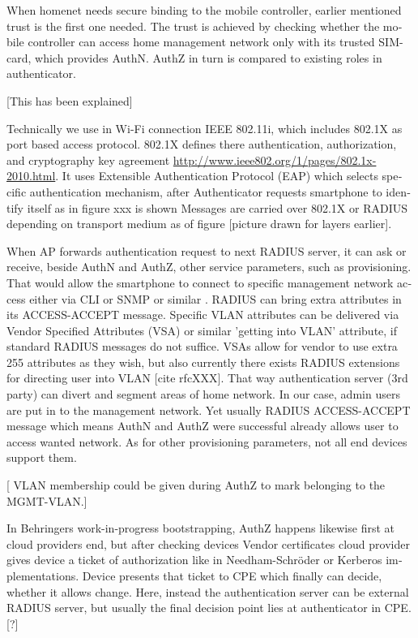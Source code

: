 \documentclass[12pt,a4paper,english]{tutthesis}
\begin{document}
\begin{otherlanguage}{english}
When homenet needs secure binding to the mobile controller, earlier
mentioned trust is the first one needed.  The trust is achieved by
checking whether the mobile controller can access home management
network only with its trusted SIM-card, which provides AuthN. AuthZ in
turn is compared to existing roles in authenticator.


[This has been explained]

Technically we use in Wi-Fi connection IEEE 802.11i, which includes
802.1X as port based access protocol.  802.1X defines there
authentication, authorization, and cryptography key agreement
\url{http://www.ieee802.org/1/pages/802.1x-2010.html}. It uses
Extensible Authentication Protocol (EAP) which selects specific
authentication mechanism\cite[p.3]{rfc5247}, after Authenticator
requests smartphone to identify itself as in figure xxx is shown
Messages are carried over 802.1X or RADIUS depending on transport
medium as of figure [picture drawn for layers earlier].


When AP forwards authentication request to next RADIUS server, it can
ask or receive, beside AuthN and AuthZ, other service parameters, such
as provisioning. That would allow the smartphone to connect to
specific management network access either via CLI or SNMP or similar
\cite[p.4]{rfc5608}.  RADIUS can bring extra attributes in its
ACCESS-ACCEPT message.  Specific VLAN attributes can be delivered via
Vendor Specified Attributes (VSA) or similar 'getting into VLAN'
attribute, if standard RADIUS messages do not suffice.  VSAs allow for
vendor to use extra 255 attributes as they wish, but also currently
there exists RADIUS extensions for directing user into VLAN [cite
rfcXXX].  That way authentication server (3rd party) can divert and
segment areas of home network.  In our case, admin users are put in to
the management network.
  Yet usually RADIUS ACCESS-ACCEPT message which means AuthN and
AuthZ were successful already allows user to access wanted network. As
for other provisioning parameters, not all end devices support them.

[ VLAN membership could be given during AuthZ to mark belonging to the
MGMT-VLAN.]  





In Behringers work-in-progress  bootstrapping\cite{draft-behringer-bootstrap},
AuthZ happens likewise first at cloud providers
end, but after checking devices Vendor certificates cloud provider
gives device a ticket of authorization like in Needham-Schröder or
Kerberos implementations. Device presents that ticket to CPE which
finally can decide, whether it allows change. 
Here, instead the authentication server can be external RADIUS server,
but usually the final decision point lies at authenticator in CPE.
[?]



\end{otherlanguage}
\end{document}
